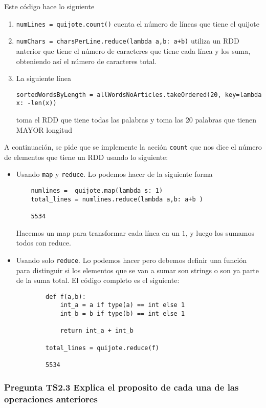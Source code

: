 \documentclass[11pt]{article}
\def\inline{\lstinline[basicstyle=\ttfamily,keywordstyle={}]}
\begin{document}
Este código hace lo siguiente
\begin{enumerate}
\item \inline{numLines = quijote.count()} cuenta el número de líneas que tiene el quijote
\item \inline{numChars = charsPerLine.reduce(lambda a,b: a+b)} utiliza un RDD anterior que tiene el número de caracteres que tiene cada línea y los suma, obteniendo así el número de caracteres total.
\item La siguiente línea
\begin{verbatim}
sortedWordsByLength = allWordsNoArticles.takeOrdered(20, key=lambda x: -len(x))
\end{verbatim} 
toma el RDD que tiene todas las palabras y toma las 20 palabras que tienen MAYOR longitud
\end{enumerate}

A continuación, se pide que se implemente la acción \inline{count} que nos dice el número de elementos que tiene un RDD usando lo siguiente:
\begin{itemize}
	\item Usando \inline{map} y \inline{reduce}. Lo podemos hacer de la siguiente forma
	\begin{verbatim}
	numlines =  quijote.map(lambda s: 1)
	total_lines = numlines.reduce(lambda a,b: a+b )
	
	5534
	\end{verbatim}
	
	Hacemos un map para transformar cada línea en un $1$, y luego los sumamos todos con reduce.
	
	\item Usando solo \inline{reduce}. Lo podemos hacer pero debemos definir una función para distinguir si los elementos que se van a sumar son strings o son ya parte de la suma total. El código completo es el siguiente:
	\begin{verbatim}
		def f(a,b):
		    int_a = a if type(a) == int else 1
		    int_b = b if type(b) == int else 1
		  
		    return int_a + int_b
		  
		total_lines = quijote.reduce(f)
		
		5534
	\end{verbatim}

\end{itemize}

\subsubsection*{ Pregunta TS2.3 Explica el proposito de cada una de las operaciones anteriores}
\end{document}
